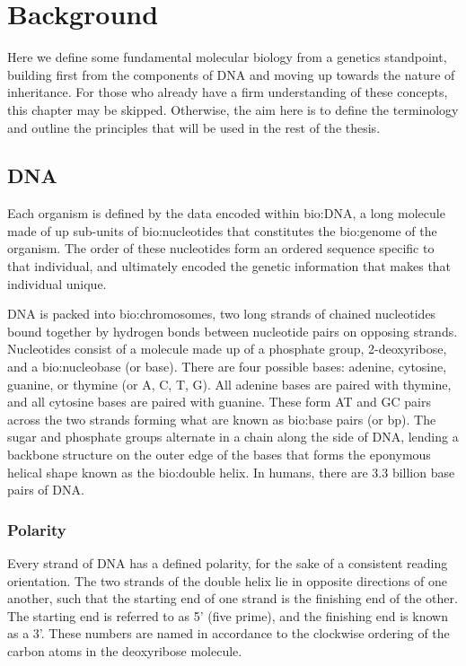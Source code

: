 

\chapter{Background}

Here we define some fundamental molecular biology from a genetics standpoint, building first from the components of DNA and moving up towards the nature of inheritance. For those who already have a firm understanding of these concepts, this chapter may be skipped. Otherwise, the aim here is to define the terminology and outline the principles that will be used in the rest of the thesis.

\section{DNA}

Each organism is defined by the data encoded within \gls{bio:DNA}, a long molecule made of up sub-units of \gls{bio:nucleotides} that constitutes the \gls{bio:genome} of the organism. The order of these nucleotides form an ordered sequence specific to that individual, and ultimately encoded the genetic information that makes that individual unique.

DNA is packed into \gls{bio:chromosomes}, two long strands of chained nucleotides bound together by hydrogen bonds between nucleotide pairs on opposing strands. Nucleotides consist of a molecule made up of a phosphate group, 2-deoxyribose, and a \gls{bio:nucleobase} (or base). There are four possible bases: adenine, cytosine, guanine, or thymine (or A, C, T, G).  All adenine bases are paired with thymine, and all cytosine bases are paired with guanine. 
These form AT and GC pairs across the two strands forming what are known as \gls{bio:base pairs} (or bp).
The sugar and phosphate groups alternate in a chain along the side of DNA, lending a backbone structure on the outer edge of the bases that forms the eponymous helical shape known as the \gls{bio:double helix}.  In humans, there are 3.3 billion base pairs of DNA.


\subsection{Polarity}

Every strand of DNA has a defined polarity, for the sake of a consistent reading orientation. The two strands of the double helix lie in opposite directions of one another, such that the starting end of one strand is the finishing end of the other.
The starting end is referred to as 5' (five prime), and the finishing end is known as a 3'. These numbers are named in accordance to the clockwise ordering of the carbon atoms in the deoxyribose molecule. 

